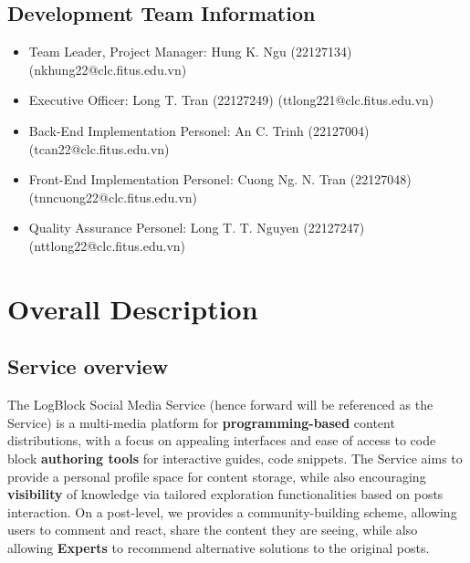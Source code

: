     \section{Development Team Information}
    \begin{itemize}
        \item Team Leader, Project Manager: Hung K. Ngu (22127134) (nkhung22@clc.fitus.edu.vn)
        \item Executive Officer: Long T. Tran (22127249) (ttlong221@clc.fitus.edu.vn)
        \item Back-End Implementation Personel: An C. Trinh (22127004) (tcan22@clc.fitus.edu.vn)
        \item Front-End Implementation Personel: Cuong Ng. N. Tran (22127048) (tnncuong22@clc.fitus.edu.vn)
        \item Quality Assurance Personel: Long T. T. Nguyen (22127247) (nttlong22@clc.fitus.edu.vn) 
    \end{itemize}
    
\newpage

\chapter{Overall Description}
    \section{Service overview}
    The LogBlock Social Media Service (hence forward will be referenced as the Service) is a multi-media platform for \textbf{programming-based} content distributions, with a focus on 
    appealing interfaces and ease of access to code block \textbf{authoring tools} for interactive guides, code snippets. The Service aims to provide a personal profile space for content storage, while
    also encouraging \textbf{visibility} of knowledge via tailored exploration functionalities based on posts interaction. On a post-level, we provides a community-building scheme, allowing users
    to comment and react, share the content they are seeing, while also allowing \textbf{Experts} to recommend alternative solutions to the original posts.

